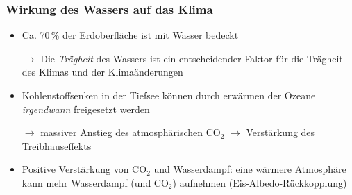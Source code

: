 \begin{frame}
	\frametitle{Wirkung des Wassers auf das Klima}
	\begin{itemize}
	\item Ca. 70\,\% der Erdoberfläche ist mit Wasser bedeckt
	\item [$\rightarrow$] Die \textit{Trägheit} des Wassers ist ein entscheidender Faktor für die Trägheit des Klimas und der Klimaänderungen %
	\item Kohlenstoffsenken in der Tiefsee können durch erwärmen der Ozeane \textit{irgendwann} freigesetzt werden
	\item[$\rightarrow$] massiver Anstieg des atmosphärischen CO$_2$ $\rightarrow$ Verstärkung des Treibhauseffekts
	\item Positive Verstärkung von CO$_2$ und Wasserdampf: eine wärmere Atmosphäre kann mehr Wasserdampf (und CO$_2$) aufnehmen (Eis-Albedo-Rückkopplung)
	\end{itemize}
\end{frame}

